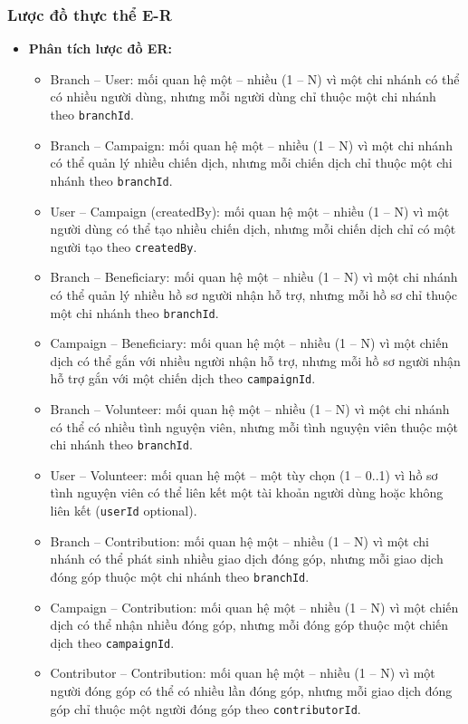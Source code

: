 \documentclass[12pt,a4paper]{article}
\begin{document}
\subsubsection{Lược đồ thực thể E-R}
\begin{itemize}
    \item \textbf{Phân tích lược đồ ER:}
    \begin{itemize}
        \item Branch -- User: mối quan hệ một -- nhiều (1 -- N) vì một chi nhánh có thể có nhiều người dùng, nhưng mỗi người dùng chỉ thuộc một chi nhánh theo \texttt{branchId}.
        \item Branch -- Campaign: mối quan hệ một -- nhiều (1 -- N) vì một chi nhánh có thể quản lý nhiều chiến dịch, nhưng mỗi chiến dịch chỉ thuộc một chi nhánh theo \texttt{branchId}.
        \item User -- Campaign (createdBy): mối quan hệ một -- nhiều (1 -- N) vì một người dùng có thể tạo nhiều chiến dịch, nhưng mỗi chiến dịch chỉ có một người tạo theo \texttt{createdBy}.
        \item Branch -- Beneficiary: mối quan hệ một -- nhiều (1 -- N) vì một chi nhánh có thể quản lý nhiều hồ sơ người nhận hỗ trợ, nhưng mỗi hồ sơ chỉ thuộc một chi nhánh theo \texttt{branchId}.
        \item Campaign -- Beneficiary: mối quan hệ một -- nhiều (1 -- N) vì một chiến dịch có thể gắn với nhiều người nhận hỗ trợ, nhưng mỗi hồ sơ người nhận hỗ trợ gắn với một chiến dịch theo \texttt{campaignId}.
        \item Branch -- Volunteer: mối quan hệ một -- nhiều (1 -- N) vì một chi nhánh có thể có nhiều tình nguyện viên, nhưng mỗi tình nguyện viên thuộc một chi nhánh theo \texttt{branchId}.
        \item User -- Volunteer: mối quan hệ một -- một tùy chọn (1 -- 0..1) vì hồ sơ tình nguyện viên có thể liên kết một tài khoản người dùng hoặc không liên kết (\texttt{userId} optional).
        \item Branch -- Contribution: mối quan hệ một -- nhiều (1 -- N) vì một chi nhánh có thể phát sinh nhiều giao dịch đóng góp, nhưng mỗi giao dịch đóng góp thuộc một chi nhánh theo \texttt{branchId}.
        \item Campaign -- Contribution: mối quan hệ một -- nhiều (1 -- N) vì một chiến dịch có thể nhận nhiều đóng góp, nhưng mỗi đóng góp thuộc một chiến dịch theo \texttt{campaignId}.
        \item Contributor -- Contribution: mối quan hệ một -- nhiều (1 -- N) vì một người đóng góp có thể có nhiều lần đóng góp, nhưng mỗi giao dịch đóng góp chỉ thuộc một người đóng góp theo \texttt{contributorId}.

\end{itemize}
\end{itemize}
\end{document}
